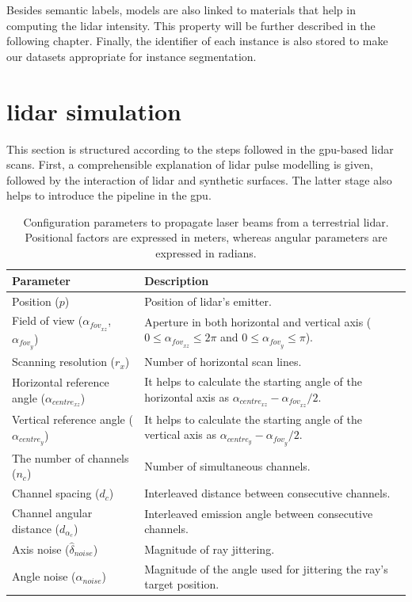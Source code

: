 Besides semantic labels, models are also linked to materials that help in computing the \acrshort{lidar} intensity. This property will be further described in the following chapter. Finally, the identifier of each instance is also stored to make our datasets appropriate for instance segmentation.

\section{\acrshort{lidar} simulation}

This section is structured according to the steps followed in the \acrshort{gpu}-based \acrshort{lidar} scans. First, a comprehensible explanation of \acrshort{lidar} pulse modelling is given, followed by the interaction of \acrshort{lidar} and synthetic surfaces. The latter stage also helps to introduce the pipeline in the \acrshort{gpu}. 

\renewcommand{\arraystretch}{1.2}
\begin{table}
    \sffamily\small
    \centering
    \caption{Configuration parameters to propagate laser beams from a terrestrial \acrshort{lidar}. Positional factors are expressed in meters, whereas angular parameters are expressed in radians.}
    \label{table:tls_parameters}
    \begin{tabular}{ll}
    \toprule
    \textbf{Parameter} & \textbf{Description} \\
    \midrule
    Position ($p$) & Position of \acrshort{lidar}'s emitter.\\
    Field of view ($\alpha_{\textit{fov}_{xz}}$, $\alpha_{\textit{fov}_{y}}$) & Aperture in both horizontal and vertical axis ($0 \leq \alpha_{\textit{fov}_{xz}} \leq 2\pi$ and $0 \leq \alpha_{\textit{fov}_{y}} \leq \pi$). \\
    Scanning resolution ($r_{x}$) & Number of horizontal scan lines. \\
    Horizontal reference angle ($\alpha_{\textit{centre}_{xz}}$) & It helps to calculate the starting angle of the horizontal axis as $\alpha_{\textit{centre}_{xz}} - \alpha_{\textit{fov}_{xz}} / 2$. \\
    Vertical reference angle ($\alpha_{\textit{centre}_{y}}$) & It helps to calculate the starting angle of the vertical axis as $\alpha_{\textit{centre}_{y}} - \alpha_{\textit{fov}_{y}} / 2$. \\
    The number of channels ($n_{c}$) & Number of simultaneous channels. \\
    Channel spacing ($d_{c}$) & Interleaved distance between consecutive channels.\\
    Channel angular distance ($d_{\alpha_{c}}$) & Interleaved emission angle between consecutive channels.\\
    Axis noise ($\hat{\delta}_{\textit{noise}}$) & Magnitude of ray jittering. \\
    Angle noise ($\alpha_{\textit{noise}}$) & Magnitude of the angle used for jittering the ray's target position. \\
    \bottomrule
    \end{tabular}
    \libertineNormal
\end{table}
\renewcommand{\arraystretch}{1}

